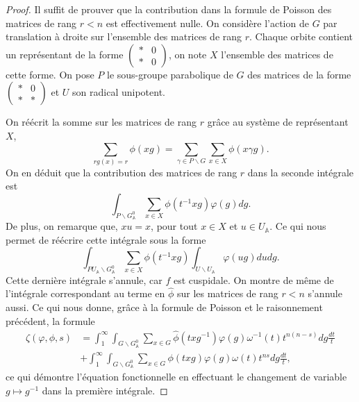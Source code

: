 \begin{proof}
Il suffit de prouver que la contribution dans la formule de Poisson des matrices de rang $r < n$ est effectivement nulle. On considère l'action de $G$ par translation à droite sur l'ensemble des matrices de rang $r$. Chaque orbite contient un représentant de la forme $\begin{pmatrix} 
* & 0 \\
* & 0 
\end{pmatrix}$, on note $X$ l'ensemble des matrices de cette forme. On pose $P$ le sous-groupe parabolique de $G$ des matrices de la forme $\begin{pmatrix} 
* & 0 \\
* & * 
\end{pmatrix}$ et $U$ son radical unipotent.

On réécrit la somme sur les matrices de rang $r$ grâce au système de représentant $X$,
\begin{equation}
\sum_{rg(x)=r}\phi(xg) = \sum_{\gamma \in P \backslash G} \sum_{x \in X} \phi(x \gamma g).
\end{equation}
On en déduit que la contribution des matrices de rang $r$ dans la seconde intégrale est
\begin{equation}
\int_{P \backslash G^0_\mathbb{A}} \sum_{x \in X}{\phi(t^{-1}x g)} \varphi(g) dg.
\end{equation}
De plus, on remarque que, $xu=x$, pour tout $x \in X$ et $u \in U_\mathbb{A}$. Ce qui nous permet de réécrire cette intégrale sous la forme
\begin{equation}
\int_{PU_\mathbb{A} \backslash G^0_\mathbb{A}} \sum_{x \in X}{\phi(t^{-1}xg)} \int_{U \backslash U_\mathbb{A}} \varphi(ug) du dg.
\end{equation}
Cette dernière intégrale s'annule, car $f$ est cuspidale. On montre de même de l'intégrale correspondant au terme en $\hat{\phi}$ sur les matrices de rang $r < n$ s'annule aussi. Ce qui nous donne, grâce à la formule de Poisson et le raisonnement précédent, la formule
\begin{equation}
\begin{split}
\zeta(\varphi, \phi, s) &= \int_1^\infty \int_{G \backslash G^0_\mathbb{A}} \sum_{x \in G}{\hat{\phi}(txg^{-1})} \varphi(g) \omega^{-1}(t) t^{n(n-s)} dg \frac{dt}{t} \\
&+ \int_1^\infty \int_{G \backslash G^0_\mathbb{A}} \sum_{x \in G}{\phi(txg)} \varphi(g) \omega(t) t^{ns} dg \frac{dt}{t},
\end{split}
\end{equation}
ce qui démontre l'équation fonctionnelle en effectuant le changement de variable $g \mapsto g^{-1}$ dans la première intégrale.
\end{proof}

